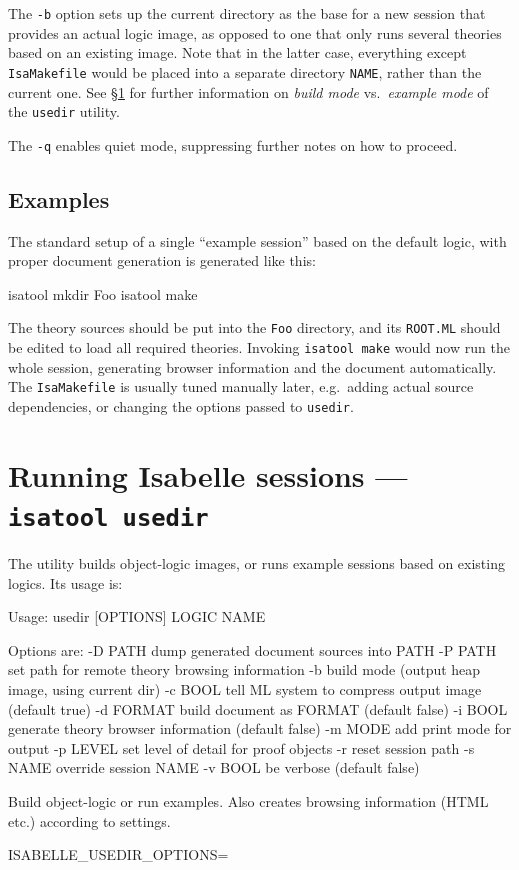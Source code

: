 \medskip The \texttt{-b} option sets up the current directory as the base for
a new session that provides an actual logic image, as opposed to one that only
runs several theories based on an existing image.  Note that in the latter
case, everything except \texttt{IsaMakefile} would be placed into a separate
directory \texttt{NAME}, rather than the current one.  See
\S\ref{sec:tool-usedir} for further information on \emph{build mode} vs.\ 
\emph{example mode} of the \texttt{usedir} utility.

\medskip The \texttt{-q} enables quiet mode, suppressing further notes on how
to proceed.


\subsection*{Examples}

The standard setup of a single ``example session'' based on the default logic,
with proper document generation is generated like this:
\begin{ttbox}
isatool mkdir Foo
isatool make
\end{ttbox}
\noindent The theory sources should be put into the \texttt{Foo} directory, and its
\texttt{ROOT.ML} should be edited to load all required theories.  Invoking
\texttt{isatool make} would now run the whole session, generating browser
information and the document automatically.  The \texttt{IsaMakefile} is
usually tuned manually later, e.g.\ adding actual source dependencies, or
changing the options passed to \texttt{usedir}.


\section{Running Isabelle sessions --- \texttt{isatool usedir}} \label{sec:tool-usedir}

The  utility builds object-logic images, or runs example
sessions based on existing logics. Its usage is:
\begin{ttbox}

Usage: usedir [OPTIONS] LOGIC NAME

  Options are:
    -D PATH      dump generated document sources into PATH
    -P PATH      set path for remote theory browsing information
    -b           build mode (output heap image, using current dir)
    -c BOOL      tell ML system to compress output image (default true)
    -d FORMAT    build document as FORMAT (default false)
    -i BOOL      generate theory browser information (default false)
    -m MODE      add print mode for output
    -p LEVEL     set level of detail for proof objects
    -r           reset session path
    -s NAME      override session NAME
    -v BOOL      be verbose (default false)

  Build object-logic or run examples. Also creates browsing
  information (HTML etc.) according to settings.

  ISABELLE_USEDIR_OPTIONS=
\end{ttbox}

